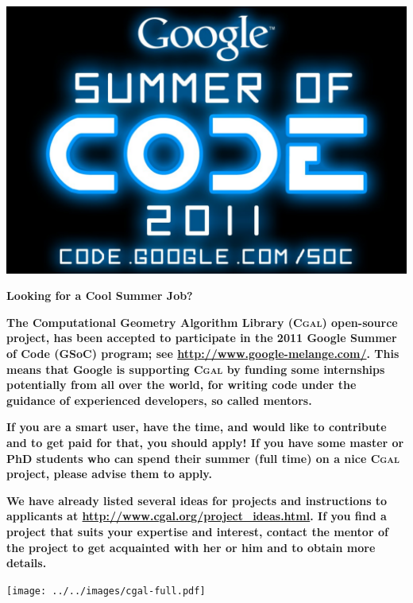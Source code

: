 \documentclass[12pt,a4paper]{article}
\newcommand{\cgal}{\textsc{Cgal}}
\begin{document}
\begin{framed}
  \newlength{\cgalwidth}\setlength{\cgalwidth}{\textwidth}
  \begin{center}
    \includegraphics[width=\cgalwidth]{GSoC2011.pdf}

    \textbf{\Huge Looking for a Cool Summer Job?}
  \end{center}

  \textbf{\large The Computational Geometry Algorithm Library (\cgal{})
    open-source project, has been accepted to participate in the 2011 Google
    Summer of Code (GSoC) program; see \url{http://www.google-melange.com/}.
    This means that Google is supporting \cgal{} by funding some internships
    potentially from all over the world, for writing code under the guidance
    of experienced developers, so called mentors.}

  \textbf{\large If you are a smart user, have the time, and would like to
    contribute and to get paid for that, you should apply! If you have
    some master or PhD students who can spend their summer (full time)
    on a nice \cgal{} project, please advise them to apply.}

  \textbf{\large We have already listed several ideas for projects and
    instructions to applicants at
    \url{http://www.cgal.org/project_ideas.html}. If you find a project
    that suits your expertise and interest, contact the mentor of the
    project to get acquainted with her or him and to obtain more details.}

  \texttt{[image: ../../images/cgal-full.pdf]}
  
\end{framed}
\end{document}

